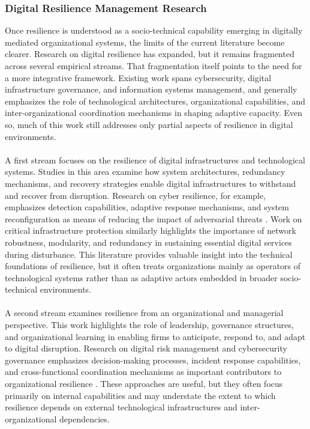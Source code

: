 \subsubsection{Digital Resilience Management Research}

Once resilience is understood as a socio-technical capability emerging in digitally mediated organizational systems, the limits of the current literature become clearer. Research on digital resilience has expanded, but it remains fragmented across several empirical streams. That fragmentation itself points to the need for a more integrative framework. Existing work spans cybersecurity, digital infrastructure governance, and information systems management, and generally emphasizes the role of technological architectures, organizational capabilities, and inter-organizational coordination mechanisms in shaping adaptive capacity. Even so, much of this work still addresses only partial aspects of resilience in digital environments.\\
\\
A first stream focuses on the resilience of digital infrastructures and technological systems. Studies in this area examine how system architectures, redundancy mechanisms, and recovery strategies enable digital infrastructures to withstand and recover from disruption. Research on cyber resilience, for example, emphasizes detection capabilities, adaptive response mechanisms, and system reconfiguration as means of reducing the impact of adversarial threats \autocite{linkov2013resilience,dupont2019cyberresilience}. Work on critical infrastructure protection similarly highlights the importance of network robustness, modularity, and redundancy in sustaining essential digital services during disturbance. This literature provides valuable insight into the technical foundations of resilience, but it often treats organizations mainly as operators of technological systems rather than as adaptive actors embedded in broader socio-technical environments.\\
\\
A second stream examines resilience from an organizational and managerial perspective. This work highlights the role of leadership, governance structures, and organizational learning in enabling firms to anticipate, respond to, and adapt to digital disruption. Research on digital risk management and cybersecurity governance emphasizes decision-making processes, incident response capabilities, and cross-functional coordination mechanisms as important contributors to organizational resilience \autocite{boin2013resilient}. These approaches are useful, but they often focus primarily on internal capabilities and may understate the extent to which resilience depends on external technological infrastructures and inter-organizational dependencies.\\
